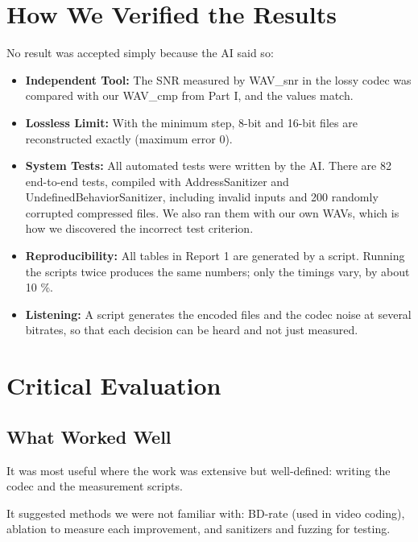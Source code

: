 \section*{How We Verified the Results}

No result was accepted simply because the AI said so:

\begin{itemize}
    \item \textbf{Independent Tool:} The SNR measured by WAV\_snr
    in the lossy codec was compared with our WAV\_cmp from Part I,
    and the values match.

    \item \textbf{Lossless Limit:} With the minimum step, 8-bit and
    16-bit files are reconstructed exactly (maximum error 0).

    \item \textbf{System Tests:} All automated tests were written by
    the AI. There are 82 end-to-end tests, compiled with
    AddressSanitizer and UndefinedBehaviorSanitizer, including
    invalid inputs and 200 randomly corrupted compressed files.
    We also ran them with our own WAVs, which is how we discovered
    the incorrect test criterion.

    \item \textbf{Reproducibility:} All tables in Report 1 are
    generated by a script. Running the scripts twice produces the
    same numbers; only the timings vary, by about 10 \%.

    \item \textbf{Listening:} A script generates the encoded files
    and the codec noise at several bitrates, so that each decision
    can be heard and not just measured.
\end{itemize}

\section*{Critical Evaluation}

\subsection*{What Worked Well}

It was most useful where the work was extensive but well-defined:
writing the codec and the measurement scripts.

It suggested methods we were not familiar with: BD-rate (used in
video coding), ablation to measure each improvement, and sanitizers
and fuzzing for testing.

